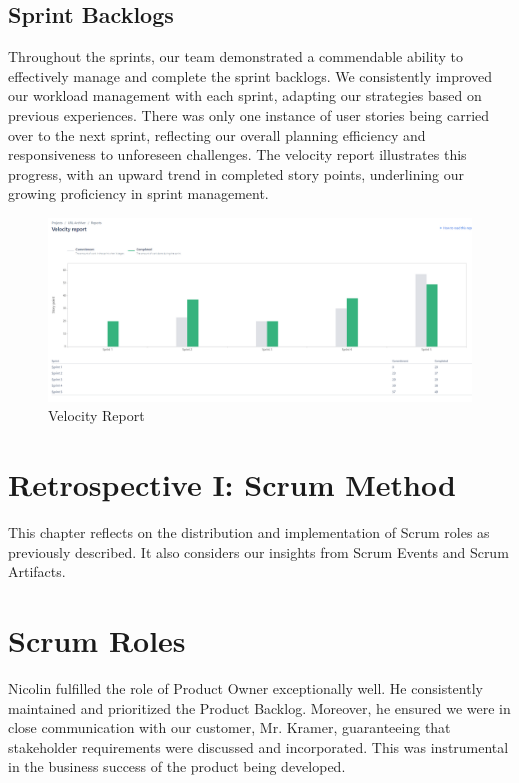 \subsection{Sprint Backlogs}
Throughout the sprints, our team demonstrated a commendable ability to effectively manage and complete the sprint backlogs.
We consistently improved our workload management with each sprint, adapting our strategies based on previous experiences.
There was only one instance of user stories being carried over to the next sprint, reflecting our overall planning efficiency and responsiveness to unforeseen challenges.
The velocity report illustrates this progress, with an upward trend in completed story points, underlining our growing proficiency in sprint management.
\begin{figure}[h!]
    \centering
    \includegraphics[width=1\textwidth]{pictures/Scrum/velocity_report.png}
    \caption{Velocity Report}
    \label{fig:velocity_report}
\end{figure}

\section{Retrospective I: Scrum Method}

This chapter reflects on the distribution and implementation of Scrum roles as previously described.
It also considers our insights from Scrum Events and Scrum Artifacts.

\section{Scrum Roles}

Nicolin fulfilled the role of Product Owner exceptionally well.
He consistently maintained and prioritized the Product Backlog.
Moreover, he ensured we were in close communication with our customer, Mr. Kramer, guaranteeing that stakeholder requirements were discussed and incorporated.
This was instrumental in the business success of the product being developed.

